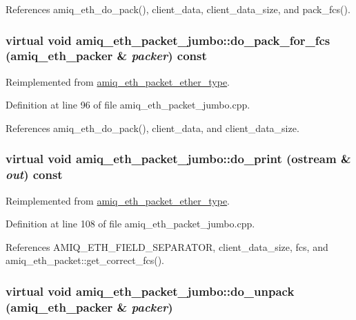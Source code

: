References amiq\_\-eth\_\-do\_\-pack(), client\_\-data, client\_\-data\_\-size, and pack\_\-fcs().\hypertarget{classamiq__eth__packet__jumbo_ad1b7057e4292645ccb65b57bcea3a549}{
\subsubsection[{do\_\-pack\_\-for\_\-fcs}]{\setlength{\rightskip}{0pt plus 5cm}virtual void amiq\_\-eth\_\-packet\_\-jumbo::do\_\-pack\_\-for\_\-fcs ({\bf amiq\_\-eth\_\-packer} \& {\em packer}) const}}
\label{classamiq__eth__packet__jumbo_ad1b7057e4292645ccb65b57bcea3a549}


Reimplemented from \hyperlink{classamiq__eth__packet__ether__type_aaa85cf778650e1c1b377392a975cb7bc}{amiq\_\-eth\_\-packet\_\-ether\_\-type}.

Definition at line 96 of file amiq\_\-eth\_\-packet\_\-jumbo.cpp.

References amiq\_\-eth\_\-do\_\-pack(), client\_\-data, and client\_\-data\_\-size.\hypertarget{classamiq__eth__packet__jumbo_a744d47397c29884a7da15e5582b331a2}{
\subsubsection[{do\_\-print}]{\setlength{\rightskip}{0pt plus 5cm}virtual void amiq\_\-eth\_\-packet\_\-jumbo::do\_\-print (ostream \& {\em out}) const}}
\label{classamiq__eth__packet__jumbo_a744d47397c29884a7da15e5582b331a2}


Reimplemented from \hyperlink{classamiq__eth__packet__ether__type_a9b2852fa1aaf278138fde2232e446f63}{amiq\_\-eth\_\-packet\_\-ether\_\-type}.

Definition at line 108 of file amiq\_\-eth\_\-packet\_\-jumbo.cpp.

References AMIQ\_\-ETH\_\-FIELD\_\-SEPARATOR, client\_\-data\_\-size, fcs, and amiq\_\-eth\_\-packet::get\_\-correct\_\-fcs().\hypertarget{classamiq__eth__packet__jumbo_a2d1f1c25847363d774336f8828384635}{
\subsubsection[{do\_\-unpack}]{\setlength{\rightskip}{0pt plus 5cm}virtual void amiq\_\-eth\_\-packet\_\-jumbo::do\_\-unpack ({\bf amiq\_\-eth\_\-packer} \& {\em packer})}}
\label{classamiq__eth__packet__jumbo_a2d1f1c25847363d774336f8828384635}


